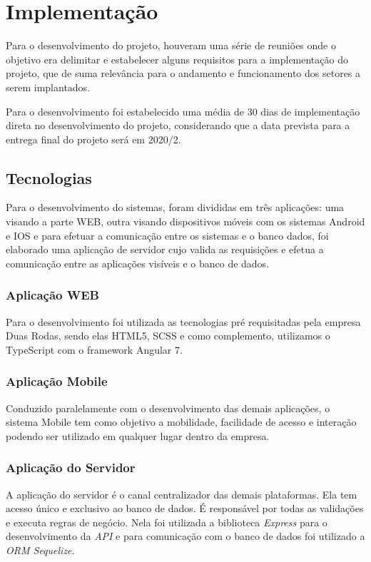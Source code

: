 \chapter{Implementação}
Para o desenvolvimento do projeto, houveram uma série de reuniões onde o objetivo era delimitar e estabelecer alguns requisitos para a implementação do projeto, que de suma relevância para o andamento e funcionamento dos setores a serem implantados.

Para o desenvolvimento foi estabelecido uma média de 30 dias de implementação direta no desenvolvimento do projeto, considerando que a data prevista para a entrega final do projeto será em 2020/2.

\section{Tecnologias}
Para o desenvolvimento do sistemas, foram divididas em três aplicações: uma visando a parte WEB, outra visando dispositivos móveis com os sistemas Android e IOS e para efetuar a comunicação entre os sistemas e o banco dados, foi elaborado uma aplicação de servidor cujo valida as requisições e efetua a comunicação entre as aplicações visíveis e o banco de dados.
\subsection{Aplicação WEB}
Para o desenvolvimento foi utilizada as tecnologias pré requisitadas pela empresa Duas Rodas, sendo elas HTML5, SCSS e como complemento, utilizamos o TypeScript com o framework Angular 7.
\subsection{Aplicação Mobile}
Conduzido paralelamente com o desenvolvimento das demais aplicações, o sistema Mobile tem como objetivo a mobilidade, facilidade de acesso e interação podendo ser utilizado em qualquer lugar dentro da empresa.

\subsection{Aplicação do Servidor}
A aplicação do servidor é o canal centralizador das demais plataformas. Ela tem acesso único e exclusivo ao banco de dados. É responsável por todas as validações e executa regras de negócio. Nela foi utilizada a biblioteca \textit{Express} para o desenvolvimento da \textit{API} e para comunicação com o banco de dados foi utilizado a \textit{ORM Sequelize}.

